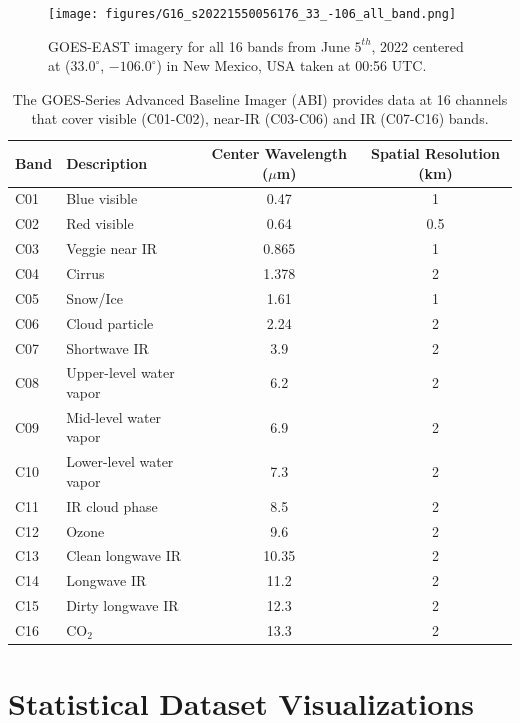\documentclass{article}
\begin{document}
\begin{figure}[!htb]
    \centering
    \texttt{[image: figures/G16\_s20221550056176\_33\_-106\_all\_band.png]}
    \caption{GOES-EAST imagery for all 16 bands from June \(5^{th}\), 2022 centered at (\(33.0^{\circ}\), \(-106.0^{\circ}\)) in New Mexico, USA taken at 00:56 UTC.}\label{all_bands}
\end{figure}

\begin{table}[!htb]
\centering
\caption{The GOES-Series Advanced Baseline Imager (ABI) provides data at 16 channels that cover visible (C01-C02), near-IR (C03-C06) and IR (C07-C16) bands.}
\begin{tabular}{llcc}
\toprule
\textbf{Band} & \textbf{Description} & \textbf{Center Wavelength (\(\mu\)m)} & \textbf{Spatial Resolution (km)} \\
\midrule
C01  & Blue visible                & 0.47     & 1   \\
C02  & Red visible                 & 0.64     & 0.5 \\
C03  & Veggie near IR             & 0.865    & 1   \\
C04  & Cirrus                     & 1.378    & 2   \\
C05  & Snow/Ice                   & 1.61     & 1   \\
C06  & Cloud particle             & 2.24     & 2   \\
C07  & Shortwave IR               & 3.9      & 2   \\
C08  & Upper-level water vapor    & 6.2      & 2   \\
C09  & Mid-level water vapor      & 6.9      & 2   \\
C10  & Lower-level water vapor    & 7.3      & 2   \\
C11  & IR cloud phase             & 8.5      & 2   \\
C12  & Ozone                      & 9.6      & 2   \\
C13  & Clean longwave IR          & 10.35    & 2   \\
C14  & Longwave IR                & 11.2     & 2   \\
C15  & Dirty longwave IR          & 12.3     & 2   \\
C16  & CO\(_2\)                         & 13.3     & 2   \\
\bottomrule
\end{tabular}
\label{band_table}
\end{table}

\section{Statistical Dataset Visualizations}
\end{document}
